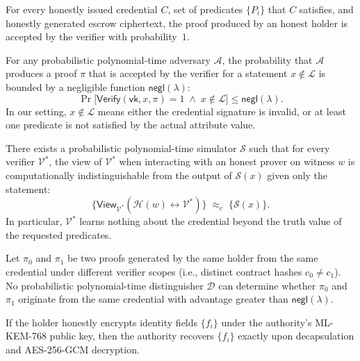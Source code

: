\begin{definition}[Completeness]\label{def:completeness}
  For every honestly issued credential $C$, set of predicates $\{P_i\}$ that $C$ satisfies, and honestly generated escrow ciphertext, the proof produced by an honest holder is accepted by the verifier with probability~$1$.
\end{definition}

\begin{definition}[Soundness]\label{def:soundness}
  For any probabilistic polynomial-time adversary $\mathcal{A}$, the probability that $\mathcal{A}$ produces a proof $\pi$ that is accepted by the verifier for a statement $x \notin \mathcal{L}$ is bounded by a negligible function $\mathsf{negl}(\lambda)$:
  \[
    \Pr\bigl[\mathsf{Verify}(\mathsf{vk}, x, \pi) = 1 \;\wedge\; x \notin \mathcal{L}\bigr] \leq \mathsf{negl}(\lambda).
  \]
  In our setting, $x \notin \mathcal{L}$ means either the credential signature is invalid, or at least one predicate is not satisfied by the actual attribute value.
\end{definition}

\begin{definition}\label{def:zk}
  There exists a probabilistic polynomial-time simulator $\mathcal{S}$ such that for every verifier $\mathcal{V}^*$, the view of $\mathcal{V}^*$ when interacting with an honest prover on witness $w$ is computationally indistinguishable from the output of $\mathcal{S}(x)$ given only the statement:
  \[
    \bigl\{\mathsf{View}_{\mathcal{V}^*}(\mathcal{H}(w) \leftrightarrow \mathcal{V}^*)\bigr\}
    \;\approx_c\;
    \bigl\{\mathcal{S}(x)\bigr\}.
  \]
  In particular, $\mathcal{V}^*$ learns nothing about the credential beyond the truth value of the requested predicates.
\end{definition}

\begin{definition}[Unlinkability]\label{def:unlinkability}
  Let $\pi_0$ and $\pi_1$ be two proofs generated by the same holder from the same credential under different verifier scopes (i.e., distinct contract hashes $c_0 \neq c_1$). No probabilistic polynomial-time distinguisher $\mathcal{D}$ can determine whether $\pi_0$ and $\pi_1$ originate from the same credential with advantage greater than $\mathsf{negl}(\lambda)$.
\end{definition}

\begin{definition}\label{def:escrow-correct}
  If the holder honestly encrypts identity fields $\{f_i\}$ under the authority's ML-KEM-768 public key, then the authority recovers $\{f_i\}$ exactly upon decapsulation and AES-256-GCM decryption.
\end{definition}

